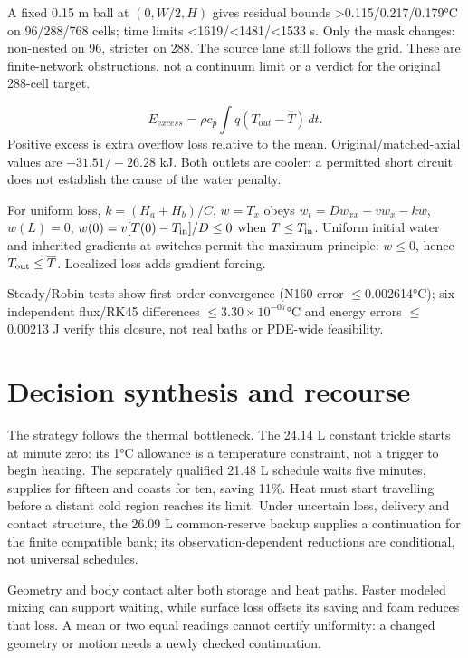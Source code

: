 \documentclass[12pt,a4paper]{article}
\begin{document}
A fixed 0.15 m ball at $(0,W/2,H)$ gives residual bounds >0.115/0.217/0.179°C on 96/288/768 cells; time limits <1619/<1481/<1533 s. Only the mask changes: non-nested on 96, stricter on 288. The source lane still follows the grid. These are finite-network obstructions, not a continuum limit or a verdict for the original 288-cell target.

\begin{equation}E_{\mathrm excess}=\rho c_p\int q(T_{\mathrm out}-\overline T)\,dt.\end{equation}
Positive excess is extra overflow loss relative to the mean. Original/matched-axial values are $-31.51/-26.28$ kJ. Both outlets are cooler: a permitted short circuit does not establish the cause of the water penalty.

For uniform loss, $k=(H_a+H_b)/C$, $w=T_x$ obeys $w_t=Dw_{xx}-vw_x-kw$, $w(L)=0$, $w(0)=v[T(0)-T_{\rm in}]/D\le0$ when $T\le T_{\rm in}$. Uniform initial water and inherited gradients at switches permit the maximum principle: $w\le0$, hence $T_{\rm out}\le\overline T$. Localized loss adds gradient forcing.

Steady/Robin tests show first-order convergence (N160 error $\leq$0.002614°C); six independent flux/RK45 differences $\leq$$3.30\times10^{-07}$°C and energy errors $\leq$0.00213 J verify this closure, not real baths or PDE-wide feasibility.

\FloatBarrier
\section{Decision synthesis and recourse}
The strategy follows the thermal bottleneck. The 24.14 L constant trickle starts at minute zero: its 1°C allowance is a temperature constraint, not a trigger to begin heating. The separately qualified 21.48 L schedule waits five minutes, supplies for fifteen and coasts for ten, saving 11\%. Heat must start travelling before a distant cold region reaches its limit. Under uncertain loss, delivery and contact structure, the 26.09 L common-reserve backup supplies a continuation for the finite compatible bank; its observation-dependent reductions are conditional, not universal schedules.

Geometry and body contact alter both storage and heat paths. Faster modeled mixing can support waiting, while surface loss offsets its saving and foam reduces that loss. A mean or two equal readings cannot certify uniformity: a changed geometry or motion needs a newly checked continuation.
\end{document}
